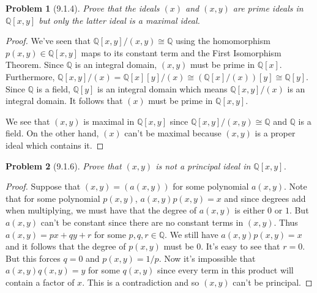 \documentclass{article}
\newtheorem{problem}{Problem}
\begin{document}

\begin{problem}[9.1.4]
Prove that the ideals $(x)$ and $(x,y)$ are prime ideals in $\mathbb{Q}[x,y]$ but only the latter ideal is a maximal ideal.
\end{problem}
\begin{proof}
We've seen that $\mathbb{Q}[x,y]/(x,y) \cong \mathbb{Q}$ using the homomorphism $p(x,y) \in \mathbb{Q}[x,y]$ maps to its constant term and the First Isomorphism Theorem. Since $\mathbb{Q}$ is an integral domain, $(x,y)$ must be prime in $\mathbb{Q}[x]$. Furthermore, $\mathbb{Q}[x,y]/(x) = \mathbb{Q}[x][y]/(x) \cong (\mathbb{Q}[x]/(x))[y] \cong \mathbb{Q}[y]$. Since $\mathbb{Q}$ is a field, $\mathbb{Q}[y]$ is an integral domain which means $\mathbb{Q}[x,y]/(x)$ is an integral domain. It follows that $(x)$ must be prime in $\mathbb{Q}[x,y]$.

We see that $(x,y)$ is maximal in $\mathbb{Q}[x,y]$ since $\mathbb{Q}[x,y]/(x,y) \cong \mathbb{Q}$ and $\mathbb{Q}$ is a field. On the other hand, $(x)$ can't be maximal because $(x,y)$ is a proper ideal which contains it.
\end{proof}

\begin{problem}[9.1.6]
Prove that $(x,y)$ is not a principal ideal in $\mathbb{Q}[x,y]$.
\end{problem}
\begin{proof}
Suppose that $(x,y) = (a(x,y))$ for some polynomial $a(x,y)$. Note that for some polynomial $p(x,y)$, $a(x,y)p(x,y) = x$ and since degrees add when multiplying, we must have that the degree of $a(x,y)$ is either $0$ or $1$. But $a(x,y)$ can't be constant since there are no constant terms in $(x,y)$. Thus $a(x,y) = px + qy + r$ for some $p,q,r \in \mathbb{Q}$. We still have $a(x,y)p(x,y) = x$ and it follows that the degree of $p(x,y)$ must be $0$. It's easy to see that $r = 0$. But this forces $q = 0$ and $p(x,y) = 1/p$. Now it's impossible that $a(x,y)q(x,y) = y$ for some $q(x,y)$ since every term in this product will contain a factor of $x$. This is a contradiction and so $(x,y)$ can't be principal.
\end{proof}
\end{document}
